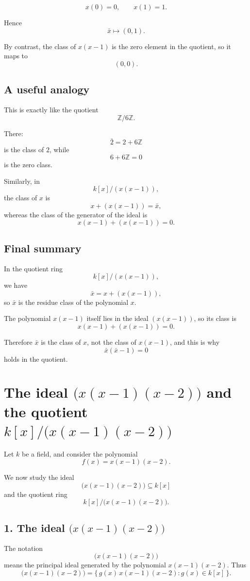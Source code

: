 \documentclass[12pt,a4paper]{article}
\theoremstyle{notespace}
\begin{document}
\[
x(0)=0,
\qquad
x(1)=1.
\]

Hence
\[
\bar x \longmapsto (0,1).
\]

By contrast, the class of \(x(x-1)\) is the zero element in the quotient, so it maps to
\[
(0,0).
\]

\subsection*{A useful analogy}

This is exactly like the quotient
\[
\mathbb Z/6\mathbb Z.
\]

There:
\[
\bar 2 = 2+6\mathbb Z
\]
is the class of \(2\), while
\[
6+6\mathbb Z=0
\]
is the zero class.

Similarly, in
\[
k[x]/(x(x-1)),
\]
the class of \(x\) is
\[
x+(x(x-1))=\bar x,
\]
whereas the class of the generator of the ideal is
\[
x(x-1)+(x(x-1))=0.
\]

\subsection*{Final summary}

In the quotient ring
\[
k[x]/(x(x-1)),
\]
we have
\[
\bar x = x+(x(x-1)),
\]
so \(\bar x\) is the residue class of the polynomial \(x\).

The polynomial \(x(x-1)\) itself lies in the ideal \((x(x-1))\), so its class is
\[
x(x-1)+(x(x-1))=0.
\]

Therefore \(\bar x\) is the class of \(x\), not the class of \(x(x-1)\), and this is why
\[
\bar x(\bar x-1)=0
\]
holds in the quotient.

\section*{The ideal \(\bigl(x(x-1)(x-2)\bigr)\) and the quotient \(k[x]/\bigl(x(x-1)(x-2)\bigr)\)}

Let \(k\) be a field, and consider the polynomial
\[
f(x)=x(x-1)(x-2).
\]

We now study the ideal
\[
\bigl(x(x-1)(x-2)\bigr)\subseteq k[x]
\]
and the quotient ring
\[
k[x]/\bigl(x(x-1)(x-2)\bigr).
\]

\subsection*{1. The ideal \(\bigl(x(x-1)(x-2)\bigr)\)}

The notation
\[
\bigl(x(x-1)(x-2)\bigr)
\]
means the principal ideal generated by the polynomial \(x(x-1)(x-2)\). Thus
\[
\bigl(x(x-1)(x-2)\bigr)
=
\{\,g(x)\,x(x-1)(x-2):g(x)\in k[x]\,\}.
\]
\end{document}
